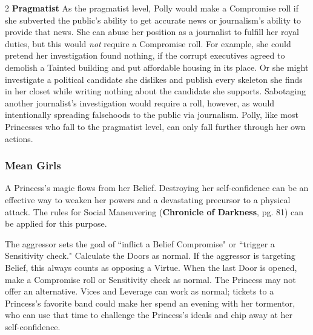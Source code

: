 \begin{multicols}{2}
\textbf{Pragmatist}
As the pragmatist level, Polly would make a Compromise roll if she subverted the public's ability to get accurate news or journalism's ability to provide that news. She can abuse her position as a journalist to fulfill her royal duties, but this would \textit{not} require a Compromise roll. For example, she could pretend her investigation found nothing, if the corrupt executives agreed to demolish a Tainted building and put affordable housing in its place. Or she might investigate a political candidate she dislikes and publish every skeleton she finds in her closet while writing nothing about the candidate she supports. Sabotaging another journalist's investigation would require a roll, however, as would intentionally spreading falsehoods to the public via journalism. Polly, like most Princesses who fall to the pragmatist level, can only fall further through her own actions.  

 

\begin{mybox}


\subsubsection*{Mean Girls}

A Princess's magic flows from her Belief. Destroying her self-confidence can be an effective way to weaken her powers and a devastating precursor to a physical attack. The rules for Social Maneuvering (\textbf{Chronicle of Darkness}, pg. 81) can be applied for this purpose.

The aggressor sets the goal of \textquotedblleft inflict a Belief Compromise" or \textquotedblleft trigger a Sensitivity check." Calculate the Doors as normal. If the aggressor is targeting Belief, this always counts as opposing a Virtue. When the last Door is opened, make a Compromise roll or Sensitivity check as normal. The Princess may not offer an alternative. Vices and Leverage can work as normal; tickets to a Princess's favorite band could make her spend an evening with her tormentor, who can use that time to challenge the Princess's ideals and chip away at her self-confidence. 


\end{mybox}
\end{multicols}
